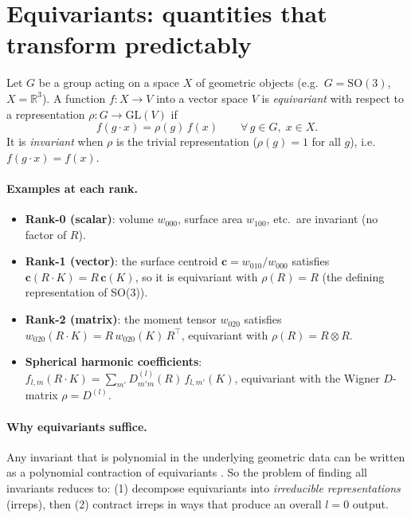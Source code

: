 \documentclass[11pt,a4paper]{article}
\begin{document}
\section{Equivariants: quantities that transform predictably}
\label{sec:equivariants}

Let $G$ be a group acting on a space $X$ of geometric objects (e.g.\
$G = \mathrm{SO}(3)$, $X = \mathbb{R}^3$).
A function $f : X \to V$ into a vector space $V$ is \emph{equivariant} with
respect to a representation $\rho : G \to \mathrm{GL}(V)$ if
\begin{equation}
  f(g \cdot x) = \rho(g)\, f(x) \qquad \forall\, g \in G,\; x \in X.
  \label{eq:equivariance}
\end{equation}
It is \emph{invariant} when $\rho$ is the trivial representation ($\rho(g) = 1$
for all $g$), i.e.\ $f(g \cdot x) = f(x)$.

\paragraph{Examples at each rank.}
\begin{itemize}
  \item \textbf{Rank-0 (scalar)}: volume $w_{000}$, surface area $w_{100}$, etc.\ are
        invariant (no factor of $R$).
  \item \textbf{Rank-1 (vector)}: the surface centroid $\mathbf{c} = w_{010}/w_{000}$
        satisfies $\mathbf{c}(R\cdot K) = R\,\mathbf{c}(K)$, so it is equivariant
        with $\rho(R) = R$ (the defining representation of SO(3)).
  \item \textbf{Rank-2 (matrix)}: the moment tensor $w_{020}$ satisfies
        $w_{020}(R \cdot K) = R\, w_{020}(K)\, R^\top$, equivariant with
        $\rho(R) = R \otimes R$.
  \item \textbf{Spherical harmonic coefficients}: $f_{l,m}(R \cdot K) =
        \sum_{m'} D^{(l)}_{m'm}(R)\, f_{l,m'}(K)$, equivariant with the
        Wigner $D$-matrix $\rho = D^{(l)}$.
\end{itemize}

\paragraph{Why equivariants suffice.}
Any invariant that is polynomial in the underlying geometric data can be
written as a polynomial contraction of equivariants \cite{Weyl1946}.
So the problem of finding all invariants reduces to: (1) decompose equivariants
into \emph{irreducible representations} (irreps), then (2) contract irreps in
ways that produce an overall $l=0$ output.
\end{document}
